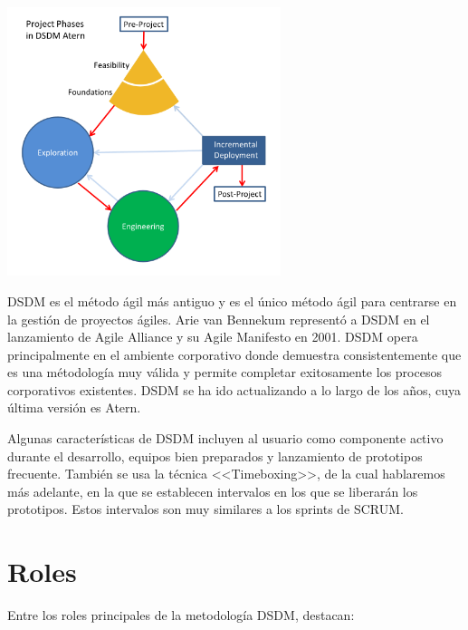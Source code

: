 \documentclass[12pt,a4paper]{article}
\begin{document}
\begin{center}
 \includegraphics[width=0.6\textwidth]{DSDM_Phases.png}
\end{center}

DSDM es el método ágil más antiguo y es el único método ágil para centrarse en la gestión de proyectos ágiles. Arie van Bennekum representó a DSDM en el lanzamiento de Agile Alliance y su Agile Manifesto en 2001. DSDM opera principalmente en el ambiente corporativo donde demuestra consistentemente que es una métodología muy válida y permite completar exitosamente los procesos corporativos existentes. DSDM se ha ido actualizando a lo largo de los años, cuya última versión es Atern.


Algunas características de DSDM incluyen al usuario como componente activo durante el desarrollo, equipos bien preparados y lanzamiento de prototipos frecuente. También se usa la técnica <<Timeboxing>>, de la cual hablaremos más adelante, en la que se establecen intervalos en los que se liberarán los prototipos. Estos intervalos son muy similares a los sprints de SCRUM.



\section{Roles}
Entre los roles principales de la metodología DSDM, destacan:
\end{document}
